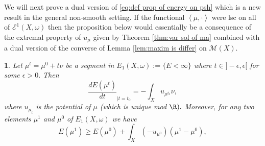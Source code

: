 \documentclass[11pt,oneside,english]{amsart}
\numberwithin{equation}{section}
\numberwithin{figure}{section}
\theoremstyle{plain}
\theoremstyle{plain}
\theoremstyle{plain}
\theoremstyle{plain}
\newtheorem{prop}[thm]{\protect\propositionname}
\theoremstyle{remark}
\theoremstyle{definition}
\providecommand{\propositionname}{Proposition}
\begin{document}
We will next prove a dual version of \ref{eq:def prop of energy on psh}
which is a new result in the general non-smooth setting. If the functional
$\left\langle \mu,\cdot\right\rangle $ were lsc on all of $\mathcal{E}^{1}(X,\omega)$
then the proposition below would essentially be a consequence of the
extremal property of $u_{\mu}$ given by Theorem \ref{thm:var sol of ma}
combined with a dual version of the converse of Lemma \ref{lem:maxim is differ}
on $\mathcal{M}(X).$ 
\begin{prop}
\label{pro:deriv of E}Let $\mu^{t}=\mu^{0}+t\nu$ be a segment in
$E_{1}(X,\omega):=\{E<\infty\}$ where $t\in]-\epsilon,\epsilon[$
for some $\epsilon>0.$ Then 
\begin{equation}
\frac{dE(\mu^{t})}{dt}_{|t=t_{0}}=-\int_{X}u_{\mu^{t_{0}}}\nu,\label{eq:der of E}
\end{equation}
 where $u_{\mu_{t}}$ is the potential of $\mu$ (which is unique
mod $\R).$ Moreover, for any two elements $\mu^{1}$ and $\mu^{0}$
of $E_{1}(X,\omega)$ we have 
\begin{equation}
E(\mu^{1})\geq E(\mu^{0})+\int_{X}(-u_{\mu^{0}})(\mu^{1}-\mu^{0}),\label{eq:conv ineq for E}
\end{equation}
 \end{prop}
\end{document}
